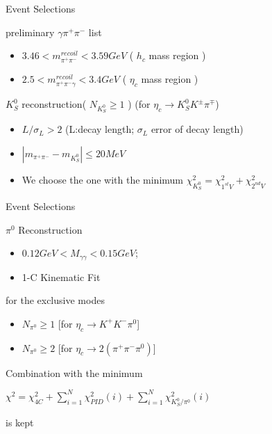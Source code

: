 \documentclass{beamer}
\begin{document}
\begin{frame}{Event Selections}
  \begin{block}{preliminary $\gamma\pi^+\pi^-$ list}
    \begin{itemize}
      \item $3.46<m_{\pi^+\pi^-}^{recoil}<3.59 GeV$ ( $h_c$ mass region )
      \item $2.5<m_{\pi^+\pi^-\gamma}^{recoil}<3.4 GeV$ ( $\eta_c$ mass region )
    \end{itemize}
  \end{block}
  \begin{block}{$K_S^0$ reconstruction( $N_{K_S^0}\ge 1 $ ) (for $\eta_c\to K^0_S K^{\pm} \pi^{\mp}$)}
    \begin{itemize}
      \item $L/\sigma_L > 2$ (L:decay length; $\sigma_L$ error of decay length)
      \item $| m_{\pi^+\pi^-} - m_{K_S^0}|\le 20 MeV$
      \item We choose the one with the minimum $\chi_{K^0_S}^2 = \chi^2_{1^{st}V} + \chi^2_{2^{nd}V}$
    \end{itemize}
  \end{block}
\end{frame}
\begin{frame}{Event Selections}
  \begin{block}{$\pi^0$ Reconstruction}
    \begin{itemize}
      \item $0.12GeV<M_{\gamma\gamma}<0.15GeV$;
      \item 1-C Kinematic Fit
    \end{itemize}
  \end{block}
  \begin{block}{for the exclusive modes}
    \begin{itemize}
      \item  $N_{\pi^0}\geq 1$ [for $\eta_c\to K^+K^-\pi^0$]
      \item  $N_{\pi^0}\geq 2$ [for $\eta_c\to 2(\pi^+\pi^-\pi^0)$]
    \end{itemize}
  \end{block}
  Combination with the minimum 
    \begin{center}
      $\chi^2 = \chi^2_{4C} + \sum^N_{i=1}\chi^2_{PID}(i)+\sum^N_{i=1}\chi^2_{K^0_S/\pi^0}(i)$
    \end{center}is kept 
\end{frame}
\end{document}
